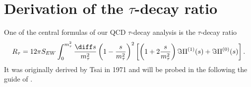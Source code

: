 
\section{Derivation of the $\tau$-decay ratio}
\label{app:tauDecayRatioDerivation}
One of the central formulas of our QCD $\tau$-decay analysis is the $\tau$-decay ratio
\begin{equation}
	R_\tau = 12 \pi S_{EW} \int_0^{m_\tau^2} \frac{\diff s}{m_\tau^2} \left(1 - \frac{s}{m_\tau^2} \right)^2 \left[ \left( 1 + 2 \frac{s}{m_\tau^2} \right) \Im \Pi^{(1)} (s) + \Im \Pi^{(0)} (s) \right].
\end{equation}
It was originally derived by Tsai in 1971 \cite{Tsai1971} and will be probed in the following the guide of \cite{Schwab2002}.

